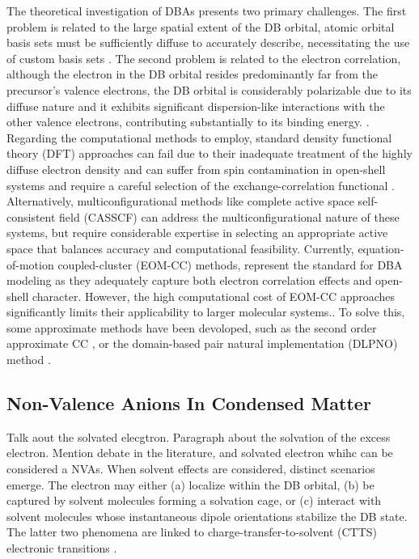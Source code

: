 The theoretical investigation of DBAs presents two primary challenges. The first problem is related to the large spatial extent of the DB orbital, atomic orbital basis sets must be sufficiently diffuse to accurately describe, necessitating the use of custom basis sets \cite{skurski2000choose}. The second problem is related to the electron correlation, although the electron in the DB orbital resides predominantly far from the precursor's valence electrons, the DB orbital is considerably polarizable due to its diffuse nature and it exhibits significant dispersion-like interactions with the other valence electrons, contributing substantially to its binding energy. \cite{simons2008molecular,simons2023molecular,gutowski1996contribution}.\\

Regarding the computational methods to employ, standard density functional theory (DFT) approaches can fail due to their inadequate treatment of the highly diffuse electron density and can suffer from spin contamination in open-shell systems and require a careful selection of the exchange-correlation functional \cite{thiam2023accurately}. Alternatively, multiconfigurational methods like complete active space self-consistent field (CASSCF) can address the multiconfigurational nature of these systems, but require considerable expertise in selecting an appropriate active space that balances accuracy and computational feasibility. Currently, equation-of-motion coupled-cluster (EOM-CC) methods, represent the standard for DBA modeling as they adequately capture both electron correlation effects and open-shell character. However, the high computational cost of EOM-CC approaches significantly limits their applicability to larger molecular systems.\cite{herbert2015quantum,jordan2003theory}. To solve this, some approximate methods have been devoloped, such as the second order approximate CC \cite{}, or the domain-based pair natural implementation (DLPNO) method \cite{haldar2020multilayer}.

\subsection{Non-Valence Anions In Condensed Matter}
Talk aout the solvated elecgtron. Paragraph about the solvation of the excess electron. Mention debate in the literature, and solvated electron whihc can be considered a NVAs.
When solvent effects are considered, distinct scenarios emerge. The electron may either (a) localize within the DB orbital, (b) be captured by solvent molecules forming a solvation cage, or (c) interact with solvent molecules whose instantaneous dipole orientations stabilize the DB state. The latter two phenomena are linked to charge-transfer-to-solvent (CTTS) electronic transitions \cite{simons2023molecular,bradforth2002excited,chen2000precursors}.

